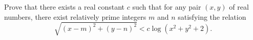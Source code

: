 Prove that there exists a real constant $c$ such that for any pair $(x,y)$ of real numbers, there exist relatively prime integers $m$ and $n$ satisfying the relation \[\sqrt{(x-m)^2 + (y-n)^2} < c\log (x^2 + y^2 + 2).\]